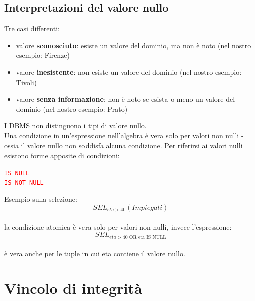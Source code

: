 \subsection{Interpretazioni del valore nullo}
Tre casi differenti:
\begin{itemize}
    \item valore \textbf{sconosciuto}: esiste un valore del dominio, ma non è noto (nel nostro esempio: Firenze)
    \item valore \textbf{inesistente}: non esiste un valore del dominio (nel nostro esempio: Tivoli)
    \item valore \textbf{senza informazione}: non è noto se esista o meno un valore del dominio (nel nostro esempio: Prato)
\end{itemize}
\noindent I DBMS non distinguono i tipi di valore nullo.\medskip\\
Una condizione in un'espressione nell'algebra è vera \underline{solo per valori non nulli} - ossia \underline{il valore nullo non soddisfa alcuna condizione}. 
Per riferirsi ai valori nulli esistono forme apposite di condizioni:
\begin{center}
\texttt{\textcolor{red}{IS NULL}}\\
\texttt{\textcolor{red}{IS NOT NULL}}
\end{center}
\noindent Esempio sulla selezione:\\
$$SEL_{eta>40}(Impiegati)$$\\
la condizione atomica è vera solo per valori non nulli, invece l'espressione:\\
$$SEL_{eta>40 \text{ OR eta IS NULL}}$$\\
è vera anche per le tuple in cui eta contiene il valore nullo.

\section{Vincolo di integrità}
